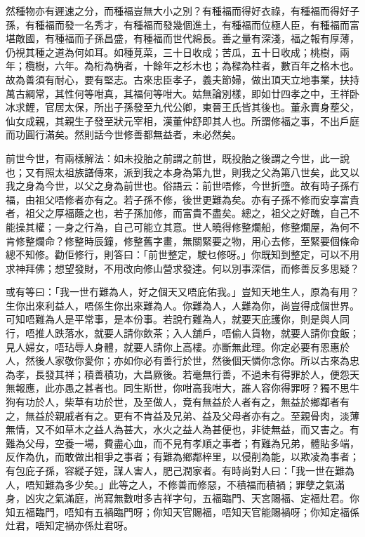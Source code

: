 \documentclass[a5paper, 12pt, openany]{book} %
\begin{document}
	然種物亦有遲速之分，而種福豈無大小之別？有種福而得好衣祿，有種福而得好子孫，有種福而發一名秀才，有種福而發幾個進土，有種福而位極人臣，有種福而富堪敵國，有種福而子孫昌盛，有種福而世代綿長。善之量有深淺，福之報有厚薄，仍視其種之道為何如耳。如種莧菜，三十日收成；苦瓜，五十日收成；桃樹，兩年；欖樹，六年。為桁為桷者，十餘年之杉木也；為樑為柱者，數百年之格木也。故為善須有耐心，要有堅志。古來忠臣孝子，義夫節婦，做出頂天立地事業，扶持萬古綱常，其性何等咁真，其福何等咁大。姑無論別樣，即如廿四孝之中，王祥卧冰求鯉，官居太保，所出子孫發至九代公卿，東晉王氏皆其後也。董永賣身塟父，仙女成親，其親生子發至狀元宰相，漢董仲舒即其人也。所謂修福之事，不出戶庭而功圓行滿矣。然則話今世修善都無益者，未必然矣。

	前世今世，有兩樣解法：如未投胎之前謂之前世，既投胎之後謂之今世，此一說也；又有照太祖族譜傳來，派到我之本身為第九世，則我之父為第八世矣，此又以我之身為今世，以父之身為前世也。俗語云：前世唔修，今世折墮。故有時子孫冇福，由祖父唔修者亦有之。若子孫不修，後世更難為矣。亦有子孫不修而安享富貴者，祖父之厚福蔭之也，若子孫加修，而富貴不盡矣。總之，祖父之好醜，自己不能操其權；一身之行為，自己可能立其意。世人曉得修整爛船，修整爛屋，為何不肯修整爛命？修整時辰鐘，修整舊字畫，無關緊要之物，用心去修，至緊要個條命總不知修。勸佢修行，則答曰：「前世整定，駛乜修呀。」你既知到整定，可以不用求神拜佛；想望發財，不用改向修山營求發達。何以別事深信，而修善反多思疑？

	或有等曰：「我一世冇難為人，好之個天又唔庇佑我。」豈知天地生人，原為有用？生你出來利益人，唔係生你出來難為人。你難為人，人難為你，尚豈得成個世界。可知唔難為人是平常事，是本份事。若說冇難為人，就要天庇護你，則是與人同行，唔推人跌落水，就要人請你飲茶；入人舖戶，唔偷人貨物，就要人請你食飯；見人婦女，唔玷辱人身體，就要人請你上高樓。亦斷無此理。你定必要有恩惠於人，然後人家敬你愛你；亦如你必有善行於世，然後個天憐你念你。所以古來為忠為孝，長發其祥；積善積功，大昌厥後。若毫無行善，不過未有得罪於人，便怨天無報應，此亦愚之甚者也。同生斯世，你咁高我咁大，誰人容你得罪呀？獨不思牛狗有功於人，柴草有功於世，及至做人，竟有無益於人者有之，無益於鄉鄰者有之，無益於親戚者有之。更有不肯益及兄弟、益及父母者亦有之。至親骨肉，淡薄無情，又不如草木之益人為甚大，水火之益人為甚便也，非徒無益，而又害之。有難為父母，空養一場，費盡心血，而不見有孝順之事者；有難為兄弟，體貼多端，反作為仇，而敢做出相爭之事者；有難為鄉鄰梓里，以侵削為能，以欺凌為事者；有包庇子孫，容縱子姪，謀人害人，肥己潤家者。有時尚對人曰：「我一世在難為人，唔知難為多少矣。」此等之人，不修善而修惡，不積福而積禍；罪孽之氣滿身，凶灾之氣滿庭，尚寫無數咁多吉祥字句，五福臨門、天宮賜福、定福灶君。你知五福臨門，唔知有五禍臨門呀；你知天官賜福，唔知天官能賜禍呀；你知定福係灶君，唔知定禍亦係灶君呀。
\end{document}
